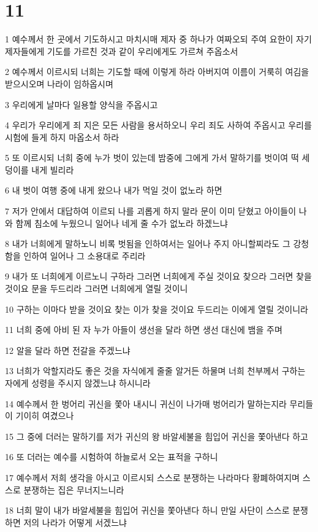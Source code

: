 \chapter{11}

\par 1 예수께서 한 곳에서 기도하시고 마치시매 제자 중 하나가 여짜오되 주여 요한이 자기 제자들에게 기도를 가르친 것과 같이 우리에게도 가르쳐 주옵소서
\par 2 예수께서 이르시되 너희는 기도할 때에 이렇게 하라 아버지여 이름이 거룩히 여김을 받으시오며 나라이 임하옵시며
\par 3 우리에게 날마다 일용할 양식을 주옵시고
\par 4 우리가 우리에게 죄 지은 모든 사람을 용서하오니 우리 죄도 사하여 주옵시고 우리를 시험에 들게 하지 마옵소서 하라
\par 5 또 이르시되 너희 중에 누가 벗이 있는데 밤중에 그에게 가서 말하기를 벗이여 떡 세 덩이를 내게 빌리라
\par 6 내 벗이 여행 중에 내게 왔으나 내가 먹일 것이 없노라 하면
\par 7 저가 안에서 대답하여 이르되 나를 괴롭게 하지 말라 문이 이미 닫혔고 아이들이 나와 함께 침소에 누웠으니 일어나 네게 줄 수가 없노라 하겠느냐
\par 8 내가 너희에게 말하노니 비록 벗됨을 인하여서는 일어나 주지 아니할찌라도 그 강청함을 인하여 일어나 그 소용대로 주리라
\par 9 내가 또 너희에게 이르노니 구하라 그러면 너희에게 주실 것이요 찾으라 그러면 찾을 것이요 문을 두드리라 그러면 너희에게 열릴 것이니
\par 10 구하는 이마다 받을 것이요 찾는 이가 찾을 것이요 두드리는 이에게 열릴 것이니라
\par 11 너희 중에 아비 된 자 누가 아들이 생선을 달라 하면 생선 대신에 뱀을 주며
\par 12 알을 달라 하면 전갈을 주겠느냐
\par 13 너희가 악할지라도 좋은 것을 자식에게 줄줄 알거든 하물며 너희 천부께서 구하는 자에게 성령을 주시지 않겠느냐 하시니라
\par 14 예수께서 한 벙어리 귀신을 쫓아 내시니 귀신이 나가매 벙어리가 말하는지라 무리들이 기이히 여겼으나
\par 15 그 중에 더러는 말하기를 저가 귀신의 왕 바알세불을 힘입어 귀신을 쫓아낸다 하고
\par 16 또 더러는 예수를 시험하여 하늘로서 오는 표적을 구하니
\par 17 예수께서 저희 생각을 아시고 이르시되 스스로 분쟁하는 나라마다 황폐하여지며 스스로 분쟁하는 집은 무너지느니라
\par 18 너희 말이 내가 바알세불을 힘입어 귀신을 쫓아낸다 하니 만일 사단이 스스로 분쟁하면 저의 나라가 어떻게 서겠느냐

